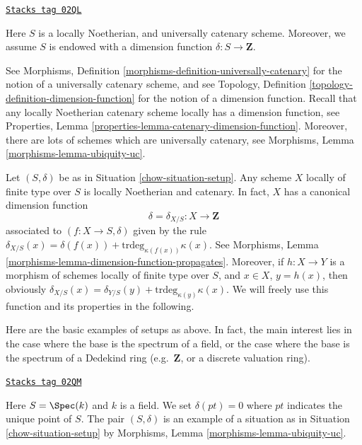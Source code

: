 \begin{definition}
\label{chow-situation-setup}
\href{https://stacks.math.columbia.edu/tag/02QL}{\texttt{Stacks tag 02QL}}

Here $S$ is a locally Noetherian, and universally catenary scheme.
Moreover, we assume $S$ is endowed with a dimension function
$\delta : S \longrightarrow \mathbf{Z}$.
\end{definition}

See Morphisms, Definition \ref{morphisms-definition-universally-catenary}
for the notion of a universally catenary scheme, and see
Topology, Definition \ref{topology-definition-dimension-function}
for the notion of a dimension function. Recall that any locally
Noetherian catenary scheme locally has a dimension function, see
Properties, Lemma \ref{properties-lemma-catenary-dimension-function}.
Moreover, there are lots of schemes which are universally catenary,
see Morphisms, Lemma \ref{morphisms-lemma-ubiquity-uc}.

\medskip\noindent
Let $(S, \delta)$ be as in Situation \ref{chow-situation-setup}.
Any scheme $X$ locally of finite type over $S$ is locally Noetherian
and catenary. In fact, $X$ has a canonical dimension function
$$
\delta = \delta_{X/S} : X \longrightarrow \mathbf{Z}
$$
associated to $(f : X \to S, \delta)$ given by the rule
$\delta_{X/S}(x) = \delta(f(x)) + \text{trdeg}_{\kappa(f(x))}\kappa(x)$.
See Morphisms, Lemma \ref{morphisms-lemma-dimension-function-propagates}.
Moreover, if $h : X \to Y$ is a morphism of schemes locally of finite
type over $S$, and $x \in X$, $y = h(x)$,
then obviously
$\delta_{X/S}(x) = \delta_{Y/S}(y) + \text{trdeg}_{\kappa(y)}\kappa(x)$.
We will freely use this function and its properties in the following.

\medskip\noindent
Here are the basic examples of setups as above.
In fact, the main interest lies in the case where the base
is the spectrum of a field, or the case where the base
is the spectrum of a Dedekind ring (e.g.\ $\mathbf{Z}$,
or a discrete valuation ring).

\begin{example}[Field]
\label{chow-example-field}
\href{https://stacks.math.columbia.edu/tag/02QM}{\texttt{Stacks tag 02QM}}

Here $S = \Spec(k)$ and $k$ is a field.
We set $\delta(pt) = 0$ where $pt$ indicates the unique point of $S$.
The pair $(S, \delta)$ is an example of a situation as in
Situation \ref{chow-situation-setup} by
Morphisms, Lemma \ref{morphisms-lemma-ubiquity-uc}.
\end{example}

